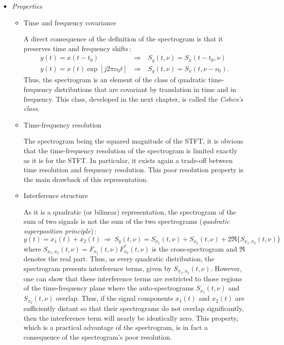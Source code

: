 \begin{itemize}
\item {\it Properties}

\begin{itemize}
\item Time and frequency covariance

A direct consequence of the definition of the spectrogram is that it
preserves time and frequency shifts\,:
\begin{eqnarray*}
y(t)=x(t-t_0) &\ \Rightarrow\ & S_y(t,\nu)=S_x(t-t_0,\nu)\\
y(t)=x(t)\exp{[j2\pi \nu_0 t]} &\ \Rightarrow\ &
S_y(t,\nu)=S_x(t,\nu-\nu_0). 
\end{eqnarray*}
Thus, the spectrogram is an element of the class of quadratic
time-frequency distributions that are covariant by translation in time and
in frequency. This class, developed in the next chapter, is called the
{\it Cohen's class}.

\item Time-frequency resolution

The spectrogram being the squared magnitude of the STFT, it is obvious that
the time-frequency resolution of the spectrogram is limited exactly as it
is for the STFT. In particular, it exists again a trade-off between time
resolution and frequency resolution. This poor resolution property is the
main drawback of this representation.

\item Interference structure

As it is a quadratic (or bilinear) representation, the spectrogram of the
sum of two signals is not the sum of the two spectrograms ({\it quadratic
superposition principle})\,:
\[y(t)=x_1(t)+x_2(t) \ \Rightarrow\ 
S_y(t,\nu)=S_{x_1}(t,\nu)+S_{x_2}(t,\nu)+2\Re{\{S_{x_1,x_2}(t,\nu)\}}\]
where $S_{x_1,x_2}(t,\nu) = F_{x_1}(t,\nu) F_{x_2}^*(t,\nu)$ is the
cross-spectrogram and $\Re{}$ denotes the real part. Thus, as every
quadratic distribution, the spectrogram presents interference terms, given
by $S_{x_1,x_2}(t,\nu)$. However, one can show \cite{HLA91} that these
interference terms are restricted to those regions of the time-frequency
plane where the auto-spectrograms $S_{x_1}(t,\nu)$ and $S_{x_2}(t,\nu)$
overlap. Thus, if the signal components $x_1(t)$ and $x_2(t)$ are
sufficiently distant so that their spectrograms do not overlap
significantly, then the interference term will nearly be identically zero.
This property, which is a practical advantage of the spectrogram, is in fact
a consequence of the spectrogram's poor resolution.
\end{itemize}


\end{itemize}
